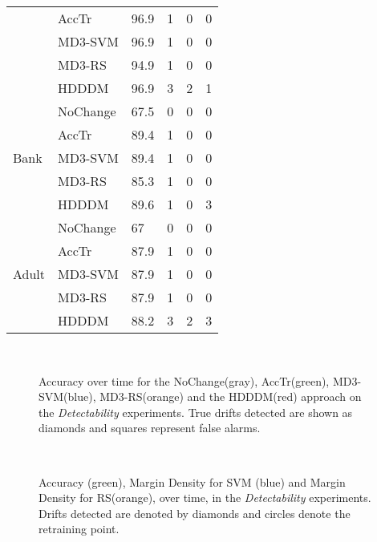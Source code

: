 \documentclass[authoryear,3p,times,twocolumn]{elsarticle}
\begin{document}
\begin{table*}[t]
{\begin{tabular}{|l|l|l|c|c|c|}
 & AccTr & 96.9 & 1 & 0 & 0 \\ \cline{2-6} 
 & MD3-SVM & 96.9 & 1 & 0 & 0 \\ \cline{2-6} 
 & MD3-RS & 94.9 & 1 & 0 & 0 \\ \cline{2-6} 
 & HDDDM & 96.9 & 3 & 2 & 1 \\ \hline
\multirow{5}{*}{Bank} & NoChange & 67.5 & 0 & 0 & 0 \\ \cline{2-6} 
 & AccTr & 89.4 & 1 & 0 & 0 \\ \cline{2-6} 
 & MD3-SVM & 89.4 & 1 & 0 & 0 \\ \cline{2-6} 
 & MD3-RS & 85.3 & 1 & 0 & 0 \\ \cline{2-6} 
 & HDDDM & 89.6 & 1 & 0 & 3 \\ \hline
\multirow{5}{*}{Adult} & NoChange & 67 & 0 & 0 & 0 \\ \cline{2-6} 
 & AccTr & 87.9 & 1 & 0 & 0 \\ \cline{2-6} 
 & MD3-SVM & 87.9 & 1 & 0 & 0 \\ \cline{2-6} 
 & MD3-RS & 87.9 & 1 & 0 & 0 \\ \cline{2-6} 
 & HDDDM & 88.2 & 3 & 2 & 3 \\ \hline
\end{tabular}}
\end{table*}


\begin{figure*}[ht]
\centering
{}
 \\
\caption{Accuracy over time for the NoChange(gray), AccTr(green), MD3-SVM(blue), MD3-RS(orange) and the HDDDM(red) approach on the \textit{Detectability} experiments. True drifts detected are shown as diamonds and squares represent false alarms. }
\label{fig:dd}
\end{figure*}


\begin{figure*}[ht]
\centering
{}
 \\
\caption{Accuracy (green), Margin Density for SVM (blue) and Margin Density for RS(orange), over time, in the \textit{Detectability} experiments. Drifts detected are denoted by diamonds and circles denote the retraining point.}
\label{fig:margindd}
\end{figure*}
\end{document}
